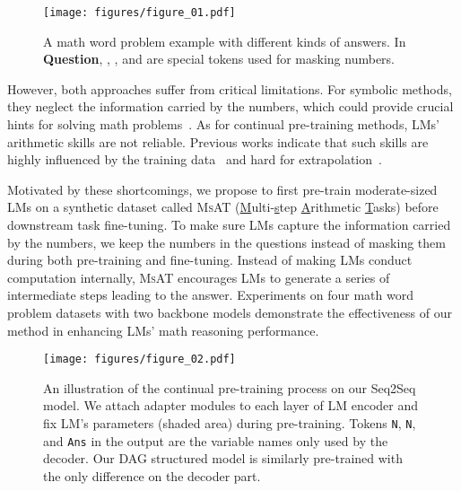 \documentclass[11pt]{article}
\newcommand\tf[1]{\textbf{#1}}
\begin{document}
  
\begin{figure}[t]
    \captionsetup{type=figure}
    \centering
    \texttt{[image: figures/figure\_01.pdf]}
    \caption{
        \label{fig:intro} 
        A math word problem example with different kinds of answers. 
In \tf{Question}, \texttt{}, \texttt{}, and \texttt{} are special tokens used for masking numbers.
    }
\end{figure}

  However, both approaches suffer from critical limitations.
For symbolic methods, they neglect the information carried by the numbers,
    which could provide crucial hints for solving math problems~\cite{wu2021mathnum,liang2022mwpbert}.
As for continual pre-training methods, 
    LMs' arithmetic skills are not reliable.
Previous works indicate that such skills are highly influenced by the training data~\cite{razeghi2022impact} and hard for extrapolation~\cite{wallace2019nlp}.
  
  
  
  Motivated by these shortcomings, 
    we propose to first pre-train moderate-sized LMs on a synthetic dataset called \textsc{MsAT} (\underline{M}ulti-\underline{s}tep \underline{A}rithmetic \underline{T}asks)
    before downstream task fine-tuning.
To make sure LMs capture the information carried by the numbers,
we keep the numbers in the questions instead of masking them during both pre-training and fine-tuning.
Instead of making LMs conduct computation internally, 
    \textsc{MsAT} encourages LMs to generate a series of intermediate steps
    leading to the answer.
Experiments on four math word problem datasets with two backbone models
    demonstrate the effectiveness of our method in enhancing LMs' math reasoning performance.


\begin{figure}[t]
\captionsetup{type=figure}
    \centering
    \texttt{[image: figures/figure\_02.pdf]}
    \vspace{-7pt}
    \caption{
        \label{fig:method} 
        An illustration of the continual pre-training process on our Seq2Seq model.
We attach adapter modules to each layer of LM encoder and fix LM's parameters (shaded area) during pre-training.
Tokens \texttt{\small N}, \texttt{\small N}, and \texttt{\small Ans} in the output are the variable names only used by the decoder.
Our DAG structured model is similarly pre-trained with the only difference on the decoder part.
    }
    \vspace{-10pt}
\end{figure}
\end{document}
